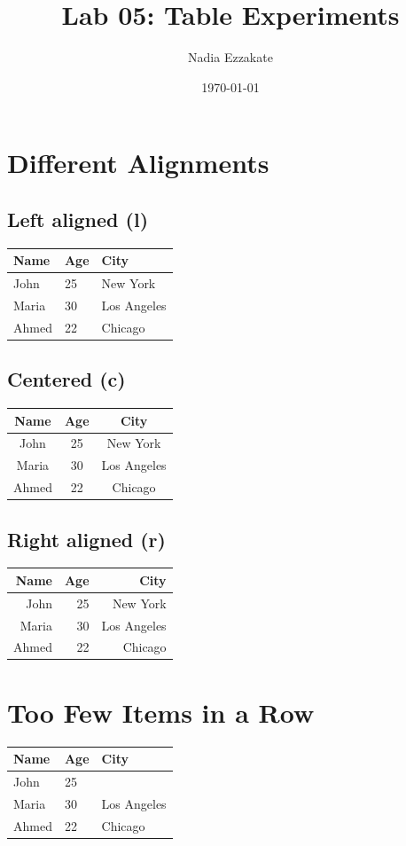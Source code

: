 \documentclass{article}
\begin{document}
\title{Lab 05: Table Experiments}
\author{Nadia Ezzakate}
\date{\today}
\maketitle

\section{Different Alignments}

\subsection{Left aligned (l)}
\begin{tabular}{lll}
\toprule
Name & Age & City \\
\midrule
John & 25 & New York \\
Maria & 30 & Los Angeles \\
Ahmed & 22 & Chicago \\
\bottomrule
\end{tabular}

\subsection{Centered (c)}
\begin{tabular}{ccc}
\toprule
Name & Age & City \\
\midrule
John & 25 & New York \\
Maria & 30 & Los Angeles \\
Ahmed & 22 & Chicago \\
\bottomrule
\end{tabular}

\subsection{Right aligned (r)}
\begin{tabular}{rrr}
\toprule
Name & Age & City \\
\midrule
John & 25 & New York \\
Maria & 30 & Los Angeles \\
Ahmed & 22 & Chicago \\
\bottomrule
\end{tabular}

\section{Too Few Items in a Row}
\begin{tabular}{lll}
\toprule
Name & Age & City \\
\midrule
John & 25 \\  %
Maria & 30 & Los Angeles \\
Ahmed & 22 & Chicago \\
\bottomrule
\end{tabular}
\end{document}
